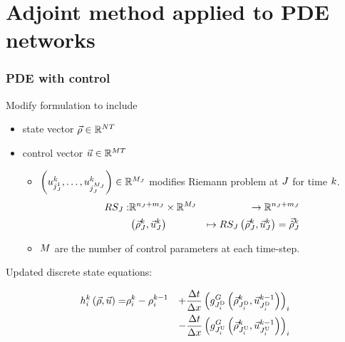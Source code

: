 \section[network adjoint]{Adjoint method applied to PDE networks} %
\label{sec:adjoint_method_applied_to_pde_networks}


\begin{frame}[t]
\frametitle{PDE with control}

Modify formulation to include

\begin{itemize}
    \item state vector $\vec{\rho}\in\mathbb{R}^{N T}$
    \item control vector $\vec{u}\in\mathbb{R}^{M T}$
    \begin{itemize}
        \item $\left(u_{j_{J}^{1}}^{k},\ldots,u_{j_{J}^{M_{J}}}^{k}\right)\in\mathbb{R}^{M_{J}}$ modifies Riemann problem at $J$ for time $k$.
        \begin{eqnarray*}
RS_{J}: & \mathbb{R}^{n_{J}+m_{J}}\times\mathbb{R}^{M_{J}} & \rightarrow\mathbb{R}^{n_{J}+m_{J}}\\
 & \left(\vec{\rho}_{J}^{k},\vec{u}_{J}^{k}\right) & \mapsto RS_{J}\left(\vec{\rho}_{J}^{k},\vec{u}_{J}^{k}\right)=\vec{\hat{\rho}}_{J}^{k}
\end{eqnarray*}
        \item $M$ are the number of control parameters at each time-step.
    \end{itemize}
\end{itemize}

Updated discrete state equations:

\begin{eqnarray}
h_{i}^{k}\left(\vec{\rho},\vec{u}\right)= & \rho_{i}^{k}-\rho_{i}^{k-1} & +\dfrac{\Delta t}{\Delta x}\left(g^{G}_{J_{i}^{\text{D}}}\left(\vec{\rho}_{J_{i}^{\text{D}}}^{k},\vec{u}_{J_{i}^{\text{D}}}^{k-1}\right)\right)_{i}\nonumber \\
 &  & -\dfrac{\Delta t}{\Delta x}\left(g^{G}_{J_{i}^{\text{U}}}\left(\vec{\rho}_{J_{i}^{\text{U}}}^{k},\vec{u}_{J_{i}^{\text{U}}}^{k-1}\right)\right)_{i}\label{eq:syseq-god}
\end{eqnarray}

\end{frame}

